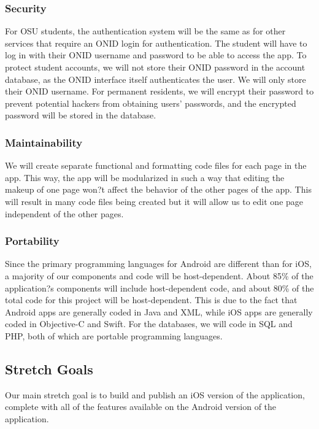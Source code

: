 \documentclass[draftclsnofoot, onecolumn, 10pt, compsoc]{IEEEtran}
\begin{document}
			\subsubsection{Security}
				For OSU students, the authentication system will be the same as for other services that require an ONID login for authentication. The student will have to log in with their ONID username and password to be able to access the app. To protect student accounts, we will not store their ONID password in the account database, as the ONID interface itself authenticates the user. We will only store their ONID username. For permanent residents, we will encrypt their password to prevent potential hackers from obtaining users' passwords, and the encrypted password will be stored in the database.
				
			\subsubsection{Maintainability}
				We will create separate functional and formatting code files for each page in the app. This way, the app will be modularized in such a way that editing the makeup of one page won?t affect the behavior of the other pages of the app. This will result in many code files being created but it will allow us to edit one page independent of the other pages.

			\subsubsection{Portability}
				Since the primary programming languages for Android are different than for iOS, a majority of our components and code will be host-dependent. About 85\% of the application?s components will include host-dependent code, and about 80\% of the total code for this project will be host-dependent. This is due to the fact that Android apps are generally coded in Java and XML, while iOS apps are generally coded in Objective-C and Swift. For the databases, we will code in SQL and PHP, both of which are portable programming languages. 
		
		\subsection{Stretch Goals}
			Our main stretch goal is to build and publish an iOS version of the application, complete with all of the features available on the Android version of the application.
			
\end{document}
